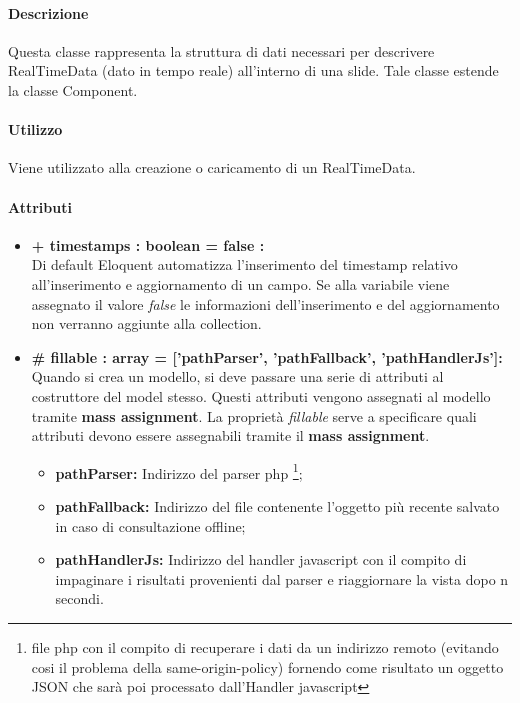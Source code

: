 	\paragraph{Descrizione}
	Questa classe rappresenta la struttura di dati necessari per descrivere RealTimeData (dato in tempo reale) all'interno di una \gls{slide}. Tale classe estende la classe Component.
	
	\paragraph{Utilizzo}
	Viene utilizzato alla creazione o caricamento di un RealTimeData.
	
	\paragraph{Attributi}
	\begin{itemize}
		\item \textbf{+ timestamps : boolean = false :}\\
		Di default Eloquent automatizza l'inserimento del timestamp relativo all'inserimento e aggiornamento di un campo. Se alla variabile viene assegnato il valore \textit{false} le informazioni dell'inserimento e del aggiornamento non verranno aggiunte alla collection.
		\item \textbf{\# fillable : array = ['pathParser’, ’pathFallback’, ’pathHandlerJs']:}\\
		Quando si crea un modello, si deve passare una serie di attributi al costruttore del model stesso. Questi attributi vengono assegnati al modello tramite \textbf{mass assignment}. La proprietà \textit{fillable} serve a specificare quali attributi devono essere assegnabili tramite il \textbf{mass assignment}.
		\begin{itemize}
			\item \textbf{pathParser:} Indirizzo del \gls{parser} \gls{php} \footnote{file \gls{php} con il compito di recuperare i dati da un indirizzo remoto (evitando cosi il problema della same-origin-policy) fornendo come risultato un oggetto \gls{JSON} che sarà poi processato dall'Handler \gls{javascript}};
			\item \textbf{pathFallback:} Indirizzo del file contenente l'oggetto più recente salvato in caso di consultazione offline;
			\item \textbf{pathHandlerJs:} Indirizzo del handler \gls{javascript} con il compito di impaginare i risultati provenienti dal \gls{parser} e riaggiornare la vista dopo n secondi.
		\end{itemize}
	\end{itemize}
\newpage


